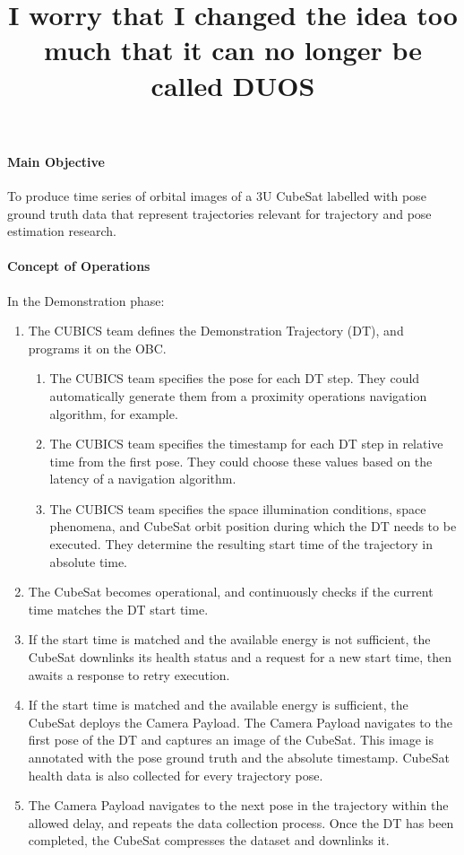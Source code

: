 \documentclass[11pt]{article}
\title{I worry that I changed the idea too much that it can no longer be called DUOS}
\begin{document}
\paragraph{Main Objective} To produce time series of orbital images of a 3U CubeSat labelled with pose ground truth data that represent trajectories relevant for trajectory and pose estimation research.

\paragraph{Concept of Operations} In the Demonstration phase:

\begin{enumerate}
\item The CUBICS team defines the Demonstration Trajectory (DT), and programs it on the OBC.
\begin{enumerate}
\item The CUBICS team specifies the pose for each DT step. They could automatically generate them from a proximity operations navigation algorithm, for example.
\item The CUBICS team specifies the timestamp for each DT step in relative time from the first pose. They could choose these values based on the latency of a navigation algorithm.
\item The CUBICS team specifies the space illumination conditions, space phenomena, and CubeSat orbit position during which the DT needs to be executed. They determine the resulting start time of the trajectory in absolute time.
\end{enumerate}
\item The CubeSat becomes operational, and continuously checks if the current time matches the DT start time.
\item If the start time is matched and the available energy is not sufficient, the CubeSat downlinks its health status and a request for a new start time, then awaits a response to retry execution.
\item If the start time is matched and the available energy is sufficient, the CubeSat deploys the Camera Payload. The Camera Payload navigates to the first pose of the DT and captures an image of the CubeSat. This image is annotated with the pose ground truth and the absolute timestamp. CubeSat health data is also collected for every trajectory pose.
\item The Camera Payload navigates to the next pose in the trajectory within the allowed delay, and repeats the data collection process. Once the DT has been completed, the CubeSat compresses the dataset and downlinks it.

\end{enumerate}
\end{document}
